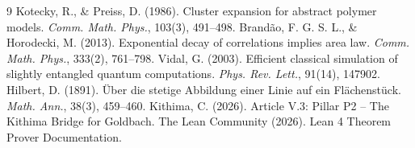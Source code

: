 \documentclass[11pt,a4paper]{article}
\begin{document}

\begin{thebibliography}{9}
  Kotecky, R., \& Preiss, D. (1986). Cluster expansion for abstract polymer models. \emph{Comm. Math. Phys.}, 103(3), 491–498.
  Brandão, F. G. S. L., \& Horodecki, M. (2013). Exponential decay of correlations implies area law. \emph{Comm. Math. Phys.}, 333(2), 761–798.
  Vidal, G. (2003). Efficient classical simulation of slightly entangled quantum computations. \emph{Phys. Rev. Lett.}, 91(14), 147902.
  Hilbert, D. (1891). Über die stetige Abbildung einer Linie auf ein Flächenstück. \emph{Math. Ann.}, 38(3), 459–460.
  Kithima, C. (2026). Article V.3: Pillar P2 – The Kithima Bridge for Goldbach.
  The Lean Community (2026). Lean 4 Theorem Prover Documentation.
\end{thebibliography}
\end{document}
